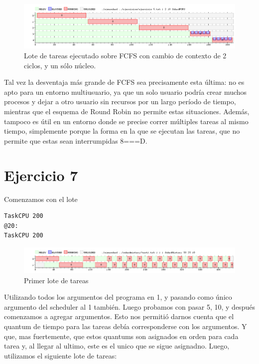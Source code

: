 \documentclass{article}
\begin{document}
\begin{figure}[h!]
\caption{Lote de tareas ejecutado sobre FCFS con cambio de contexto de 2 ciclos, y un sólo núcleo. \label{grf:ex6-1}}
\centering
\includegraphics[width=15cm]{../ejercicios/ejercicio 6}
\end{figure}

Tal vez la desventaja más grande de FCFS sea precisamente esta última: no es apto para un entorno multiusuario, ya que un solo usuario podría crear muchos procesos y dejar a otro usuario sin recursos por un largo período de tiempo, mientras que el esquema de Round Robin no permite estas situaciones. Además, tampoco es útil en un entorno donde se precise correr múltiples tareas al mismo tiempo, simplemente porque la forma en la que se ejecutan las tareas, que no permite que estas sean interrumpidas 8===D.

\section{Ejercicio 7}

Comenzamos con el lote

\begin{verbatim}
TaskCPU 200
@20:
TaskCPU 200
\end{verbatim}

\begin{figure}[h!]
\caption{Primer lote de tareas \label{grf:ex7-1}}
\centering
\includegraphics[width=15cm]{../ejercicios/ejercicio 7-1}
\end{figure}

Utilizando todos los argumentos del programa en 1, y pasando como único argumento del scheduler al 1 también. Luego probamos con pasar 5, 10, y después comenzamos a agregar argumentos. Esto nos permitió darnos cuenta que el quantum de tiempo para las tareas debía corresponderse con los argumentos. Y que, mas fuertemente, que estos quantums son asignados en orden para cada tarea y, al llegar al ultimo, este es el unico que se sigue asignadno. Luego, utilizamos el siguiente lote de tareas:
\end{document}
